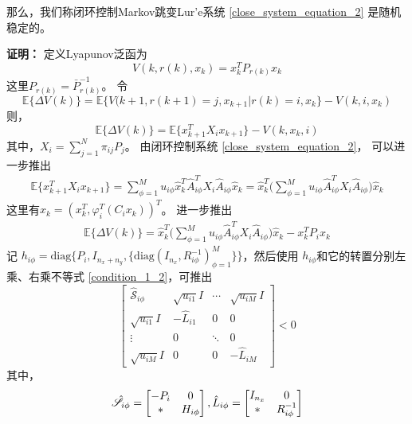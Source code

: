 	那么，我们称闭环控制Markov跳变Lur'e系统 \eqref{close_system_equation_2} 是随机稳定的。
	
	{\bf 证明：} 定义Lyapunov泛函为
	\begin{equation}\label{lyapunov_funciton} 
	V(k,r(k),x_k)=x^{T}_{k}P_{r(k)}x_{k}
	\end{equation}
	这里$P_{r(k)}=\bar{P}^{-1}_{r(k)}$。 令 
	\begin{equation*}
		\mathbb{E}\{\varDelta V(k)\}=\mathbb{E}\{V(k+1,r(k+1)=j,x_{k+1}|r(k)=i,x_k \}-V(k,i,x_k)
	\end{equation*}
	则，
	\begin{equation} \label{lypfunction}
	\mathbb{E}\{\varDelta V(k)\}=\mathbb{E}\{x^{T}_{k+1}X_{i} x_{k+1} \}-V(k,x_k,i)
	\end{equation} 
	其中，$X_{i} = \sum_{j=1}^{N}\pi_{ij}P_{j}$。 由闭环控制系统 \eqref{close_system_equation_2}，  可以进一步推出
	\begin{equation}
	\begin{split}
	\mathbb{E}\{x^{T}_{k+1}X_{i} x_{k+1} \} = \sum_{\phi=1}^{M} u_{i\phi} \hat{x}^{T}_{k} \hat{A}^{T}_{i\phi}X_{i}\hat{A}_{i\phi}\hat{x}_{k} =\hat{x}^{T}_{k} \Big( \sum_{\phi=1}^{M}u_{i\phi}\hat{A}^{T}_{i\phi}X_{i}\hat{A}_{i\phi}\Big) \hat{x}_{k} 
	\end{split}
	\end{equation}
	这里有$\hat{x}_{k}=(x^{T}_k,\varphi^{T}_{i}(C_{i}x_{k}))^{T}$。 进一步推出
	\begin{equation} \label{leq18}
	\begin{split}
	\mathbb{E}\{\varDelta V(k)\}=\hat{x}^{T}_{k} \Big( \sum_{\phi=1}^{M}u_{i\phi}\hat{A}^{T}_{i\phi}X_{i}\hat{A}_{i\phi}\Big) \hat{x}_{k} -x^{T}_{k}P_{i}x_{k}
	\end{split}
	\end{equation}
	记 $h_{i\phi} = \mathrm{diag}\Big\{P_{i}, I_{n_x+n_y},\{\mathrm{diag}(I_{n_x},R^{-1}_{i\phi})^{M}_{\phi=1} \} \Big\}$，然后使用 $h_{i\phi}$和它的转置分别左乘、右乘不等式 \eqref{condition_1_2}，可推出
	\begin{equation}\label{st}
	\begin{bmatrix} 
	\hat{\mathscr{S}}_{i\phi}&
	\sqrt{u_{i1}}I&
	\cdots&
	\sqrt{u_{iM}}I\\
	\sqrt{u_{i1}}I&-\hat{L}_{i1}&0&0\\ 
	\vdots&0&\ddots&0\\
	\sqrt{u_{iM}}I&0&0&
	-\hat{L}_{iM}
	\end{bmatrix} <0
	\end{equation}
	其中，
	\begin{equation} \notag
	\begin{aligned}
	\hat{\mathscr{S}}_{i\phi}=\begin{bmatrix}
	-P_{i }&0\\
	*&H_{i\phi}
	\end{bmatrix},
	\hat{L}_{i\phi} = \begin{bmatrix}
	I_{n_x}&0\\
	*&R^{-1}_{i\phi}
	\end{bmatrix}
	\end{aligned}
	\end{equation}
